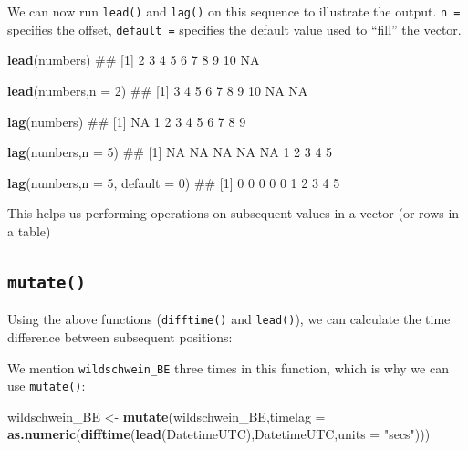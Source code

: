 \documentclass[]{book}
\newenvironment{Shaded}{\begin{snugshade}}{\end{snugshade}}
\newcommand{\KeywordTok}[1]{\textcolor[rgb]{0.13,0.29,0.53}{\textbf{{#1}}}}
\newcommand{\DataTypeTok}[1]{\textcolor[rgb]{0.13,0.29,0.53}{{#1}}}
\newcommand{\DecValTok}[1]{\textcolor[rgb]{0.00,0.00,0.81}{{#1}}}
\newcommand{\StringTok}[1]{\textcolor[rgb]{0.31,0.60,0.02}{{#1}}}
\newcommand{\NormalTok}[1]{{#1}}
\theoremstyle{definition}
\theoremstyle{definition}
\theoremstyle{definition}
\theoremstyle{remark}
\begin{document}
We can now run \texttt{lead()} and \texttt{lag()} on this sequence to
illustrate the output. \texttt{n\ =} specifies the offset,
\texttt{default\ =} specifies the default value used to ``fill'' the
vector.

\begin{Shaded}
\begin{Highlighting}[]
\KeywordTok{lead}\NormalTok{(numbers)}
\NormalTok{##  [1]  2  3  4  5  6  7  8  9 10 NA}

\KeywordTok{lead}\NormalTok{(numbers,}\DataTypeTok{n =} \DecValTok{2}\NormalTok{)}
\NormalTok{##  [1]  3  4  5  6  7  8  9 10 NA NA}

\KeywordTok{lag}\NormalTok{(numbers)}
\NormalTok{##  [1] NA  1  2  3  4  5  6  7  8  9}

\KeywordTok{lag}\NormalTok{(numbers,}\DataTypeTok{n =} \DecValTok{5}\NormalTok{)}
\NormalTok{##  [1] NA NA NA NA NA  1  2  3  4  5}

\KeywordTok{lag}\NormalTok{(numbers,}\DataTypeTok{n =} \DecValTok{5}\NormalTok{, }\DataTypeTok{default =} \DecValTok{0}\NormalTok{)}
\NormalTok{##  [1] 0 0 0 0 0 1 2 3 4 5}
\end{Highlighting}
\end{Shaded}

This helps us performing operations on subsequent values in a vector (or
rows in a table)

\subsection{\texorpdfstring{\texttt{mutate()}}{mutate()}}\label{mutate}

Using the above functions (\texttt{difftime()} and \texttt{lead()}), we
can calculate the time difference between subsequent positions:

\begin{Shaded}
\end{Shaded}

We mention \texttt{wildschwein\_BE} three times in this function, which
is why we can use \texttt{mutate()}:

\begin{Shaded}
\begin{Highlighting}[]
\NormalTok{wildschwein_BE <-}\StringTok{ }\KeywordTok{mutate}\NormalTok{(wildschwein_BE,}\DataTypeTok{timelag =} \KeywordTok{as.numeric}\NormalTok{(}\KeywordTok{difftime}\NormalTok{(}\KeywordTok{lead}\NormalTok{(DatetimeUTC),DatetimeUTC,}\DataTypeTok{units =} \StringTok{"secs"}\NormalTok{)))}
\end{Highlighting}
\end{Shaded}
\end{document}
